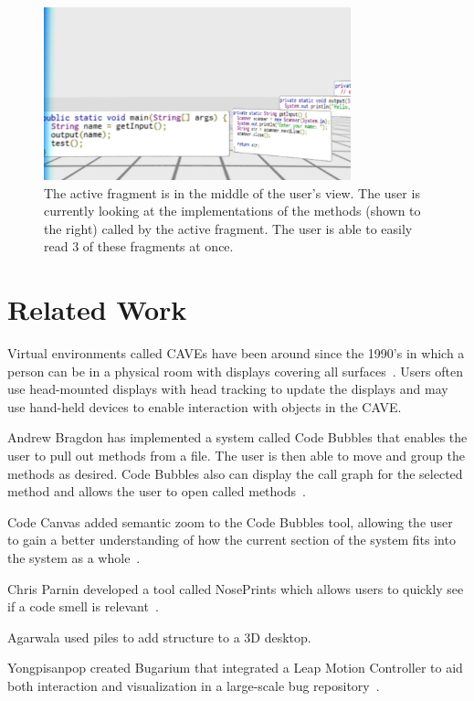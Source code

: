 \documentclass[conference]{IEEEtran}
\begin{document}
\begin{figure}[ht]
\centering
\includegraphics[width=\textwidth,height=5cm]{figures/unwarpped_stack}
\caption{The active fragment is in the middle of the user's view. The user is currently looking at the implementations of the methods (shown to the right) called by the active fragment. The user is able to easily read 3 of these fragments at once.  \label{immersion}}
\end{figure}

\section{Related Work}
Virtual environments called CAVEs have been around since the 1990's in which a person can be in a physical room with displays covering all surfaces~\cite{Cruz-Neira:CAVE}.  
Users often use head-mounted displays with head tracking to update the displays and may use hand-held devices to enable interaction with objects in the CAVE.

Andrew Bragdon has implemented a system called Code Bubbles that enables the user to pull out methods from a file. 
The user is then able to move and group the methods as desired.  
Code Bubbles also can display the call graph for the selected method and allows the user to open called methods~\cite{Bragdon:CodeBubbles}.

Code Canvas added semantic zoom to the Code Bubbles tool, allowing the user to gain a better understanding of how the current section of the system fits into the system as a whole~\cite{DeLine:CodeCanvas}.

Chris Parnin developed a tool called NosePrints which allows users to quickly see if a code smell is relevant~\cite{parnin:Noseprints}.

Agarwala used piles to add structure to a 3D desktop.~\cite{Agarawala:BumpTop}

Yongpisanpop created Bugarium that integrated a Leap Motion Controller to aid both interaction and visualization in a large-scale bug repository~\cite{Bugarium}.
\end{document}

